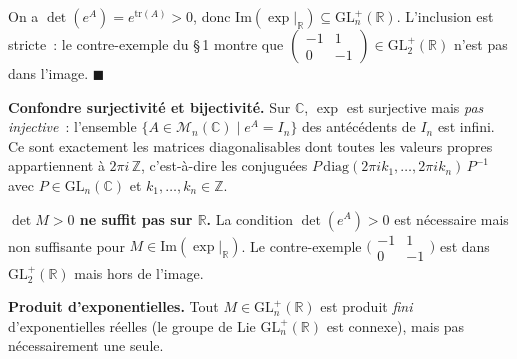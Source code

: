 
\begin{mdframed}[style=proofbar]
  On a $\det(e^A) = e^{\mathrm{tr}(A)} > 0$, donc
  $\mathrm{Im}(\exp|_{\mathbb{R}}) \subseteq \mathrm{GL}_n^+(\mathbb{R})$.
  L'inclusion est stricte~: le contre-exemple du §\,1 montre que
  $\begin{pmatrix}-1&1\\0&-1\end{pmatrix} \in \mathrm{GL}_2^+(\mathbb{R})$
  n'est pas dans l'image. \hfill$\blacksquare$
\end{mdframed}

\decsep{}



\begin{mdframed}[style=cexbar]
  \textbf{Confondre surjectivité et bijectivité.}\enspace
  Sur $\mathbb{C}$, $\exp$ est surjective mais \emph{pas injective}~:
  l'ensemble $\{A \in \mathcal{M}_n(\mathbb{C}) \mid e^A = I_n\}$ des antécédents
  de $I_n$ est infini. Ce sont exactement les matrices diagonalisables dont
  toutes les valeurs propres appartiennent à $2\pi i\,\mathbb{Z}$, c'est-à-dire
  les conjuguées $P\,\mathrm{diag}(2\pi i k_1,\dots,2\pi i k_n)\,P^{-1}$ avec
  $P \in \mathrm{GL}_n(\mathbb{C})$ et $k_1,\dots,k_n \in \mathbb{Z}$.

  \smallskip\noindent
  \textbf{$\det M > 0$ ne suffit pas sur $\mathbb{R}$.}\enspace
  La condition $\det(e^A)>0$ est nécessaire mais non suffisante pour
  $M \in \mathrm{Im}(\exp|_{\mathbb{R}})$. Le contre-exemple
  $\bigl(\begin{smallmatrix}-1&1\\0&-1\end{smallmatrix}\bigr)$
  est dans $\mathrm{GL}_2^+(\mathbb{R})$ mais hors de l'image.

  \smallskip\noindent
  \textbf{Produit d'exponentielles.}\enspace
  Tout $M \in \mathrm{GL}_n^+(\mathbb{R})$ est produit \emph{fini}
  d'exponentielles réelles (le groupe de Lie $\mathrm{GL}_n^+(\mathbb{R})$
  est connexe), mais pas nécessairement une seule.
\end{mdframed}

\vspace{6pt}
\exolabel

